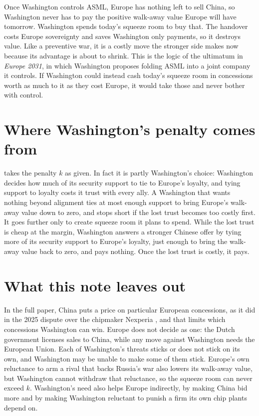 \documentclass[11pt]{article}
\begin{document}
Once Washington controls ASML, Europe has nothing left to sell China, so Washington never has to pay the positive walk-away value Europe will have tomorrow. Washington spends today's squeeze room to buy that. The handover costs Europe sovereignty and saves Washington only payments, so it destroys value. Like a preventive war, it is a costly move the stronger side makes now because its advantage is about to shrink. This is the logic of the ultimatum in \emph{Europe 2031}, in which Washington proposes folding ASML into a joint company it controls. If Washington could instead cash today's squeeze room in concessions worth as much to it as they cost Europe, it would take those and never bother with control.

\section{Where Washington's penalty comes from}

 takes the penalty $k$ as given. In fact it is partly Washington's choice: Washington decides how much of its security support to tie to Europe's loyalty, and tying support to loyalty costs it trust with every ally. A Washington that wants nothing beyond alignment ties at most enough support to bring Europe's walk-away value down to zero, and stops short if the lost trust becomes too costly first. It goes further only to create squeeze room it plans to spend. While the lost trust is cheap at the margin, Washington answers a stronger Chinese offer by tying more of its security support to Europe's loyalty, just enough to bring the walk-away value back to zero, and pays nothing. Once the lost trust is costly, it pays.

\section{What this note leaves out}

In the full paper, China puts a price on particular European concessions, as it did in the 2025 dispute over the chipmaker Nexperia \citep{taylorwessing2025nexperia, gerechtshof2025nexperia}, and that limits which concessions Washington can win. Europe does not decide as one: the Dutch government licenses sales to China, while any move against Washington needs the European Union. Each of Washington's threats sticks or does not stick on its own, and Washington may be unable to make some of them stick. Europe's own reluctance to arm a rival that backs Russia's war also lowers its walk-away value, but Washington cannot withdraw that reluctance, so the squeeze room can never exceed $k$. Washington's need also helps Europe indirectly, by making China bid more and by making Washington reluctant to punish a firm its own chip plants depend on.
\end{document}
